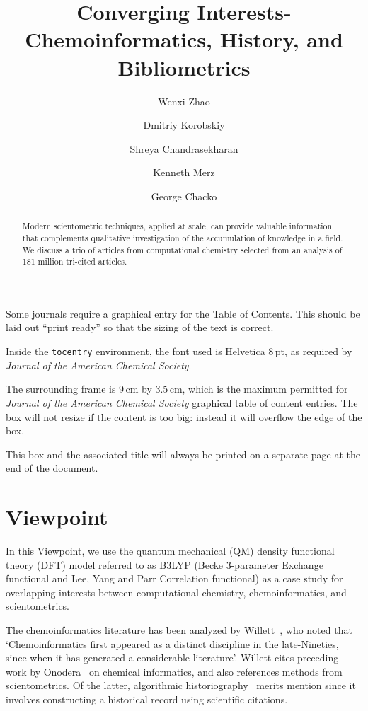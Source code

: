 \documentclass[journal=jcdis8,manuscript=article]{achemso}
\author{Wenxi Zhao}
\author{Dmitriy Korobskiy}
\author{Shreya Chandrasekharan}
\affiliation[NET ESolutions Corporation (an NTT DATA Company)]{Netelabs, NET ESolutions Corporation, VA, USA}
\author{Kenneth Merz}
\affiliation[Michigan State University]{Department of Chemistry, Michigan State University, MI, USA}
\author{George Chacko}
\affiliation[University of Illinois Urbana-Champaign]{Dept. of Computer Science, University of Illinois Urbana-Champaign, IL, USA}
\title{Converging Interests- Chemoinformatics, History, and Bibliometrics}
\begin{document}

\begin{tocentry}
Some journals require a graphical entry for the Table of Contents.
This should be laid out ``print ready'' so that the sizing of the
text is correct.

Inside the \texttt{tocentry} environment, the font used is Helvetica
8\,pt, as required by \emph{Journal of the American Chemical
Society}.

The surrounding frame is 9\,cm by 3.5\,cm, which is the maximum
permitted for  \emph{Journal of the American Chemical Society}
graphical table of content entries. The box will not resize if the
content is too big: instead it will overflow the edge of the box.

This box and the associated title will always be printed on a
separate page at the end of the document.

\end{tocentry}

\begin{abstract}

Modern scientometric techniques, applied at scale, can provide valuable information that complements qualitative investigation of the accumulation of knowledge in a field. We discuss a trio of articles from computational chemistry selected from an analysis of 181 million tri-cited 
articles. 

\end{abstract}

\section{Viewpoint}

In this Viewpoint, we use the quantum mechanical (QM) density functional theory (DFT) model referred to as B3LYP (Becke 3-parameter Exchange functional\citep{becke1993dft} and Lee, Yang and Parr Correlation functional\citep{lyp1988}) as a case study for overlapping interests between computational chemistry, chemoinformatics, and scientometrics.

The chemoinformatics literature has been analyzed by Willett~\citep{willett2008}, who noted that  `Chemoinformatics first appeared as a distinct discipline in the late-Nineties, since when it has generated a considerable literature'. Willett cites preceding work by Onodera~\citep{onodera2003} on chemical informatics, and also references methods from scientometrics. Of the latter, algorithmic historiography~\citep{garfield2004} merits mention since it involves constructing a historical record using scientific citations. 
\end{document}
